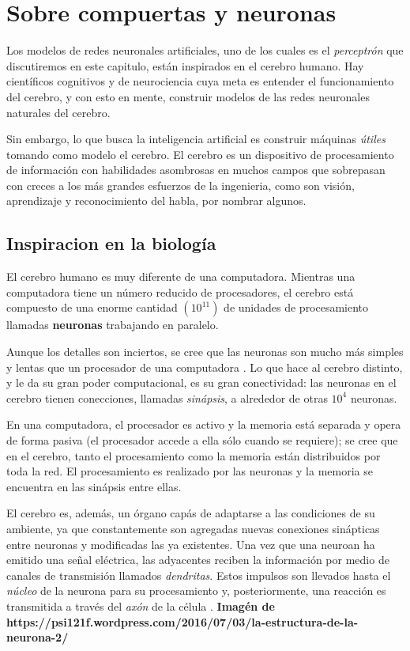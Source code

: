 \section{Sobre compuertas y neuronas}
Los modelos de redes neuronales artificiales, uno de los cuales es el \textit{perceptrón}
que discutiremos en este capitulo, están inspirados en el cerebro humano. Hay científicos
cognitivos y de neurociencia cuya meta es entender el funcionamiento del cerebro, y con
esto en mente, construir modelos de las redes neuronales naturales del cerebro.

Sin embargo, lo que busca la inteligencia artificial es construir máquinas \textit{útiles}
tomando como modelo el cerebro. El cerebro es un dispositivo de procesamiento de información
con habilidades asombrosas en muchos campos que sobrepasan con creces a los más grandes
esfuerzos de la ingenieria, como son visión, aprendizaje y reconocimiento del habla, por
nombrar algunos.

\subsection{Inspiracion en la biología}
El cerebro humano es muy diferente de una computadora. Mientras una computadora tiene
un número reducido de procesadores, el cerebro está compuesto de una enorme cantidad $(10^{11})$
de unidades de procesamiento llamadas \textbf{neuronas} trabajando en paralelo.

Aunque los detalles son inciertos, se cree que las neuronas son mucho más simples y lentas
que un procesador de una computadora \cite{ethem}. Lo que hace al cerebro distinto, y le da
su gran poder computacional, es su gran conectividad: las neuronas en el cerebro tienen
conecciones, llamadas \textit{sinápsis}, a alrededor de otras $10^{4}$ neuronas.

En una computadora, el procesador es activo y la memoria está separada y opera de forma pasiva
(el procesador accede a ella sólo cuando se requiere); se cree que en el cerebro, tanto el
procesamiento como la memoria están distribuidos por toda la red. El procesamiento es realizado
por las neuronas y la memoria se encuentra en las sinápsis entre ellas.

El cerebro es, además, un órgano capás de adaptarse a las condiciones de su ambiente, ya que
constantemente son agregadas nuevas conexiones sinápticas entre neuronas y modificadas
las ya existentes. Una vez que una neuroan ha emitido una señal eléctrica, las adyacentes
reciben la información por medio de canales de transmisión llamados \textit{dendritas}. Estos
impulsos son llevados hasta el \textit{núcleo} de la neurona para su procesamiento y, posteriormente,
una reacción es transmitida a través del \textit{axón} de la célula \cite{memes}.
\textbf{Imagén de https://psi121f.wordpress.com/2016/07/03/la-estructura-de-la-neurona-2/}


